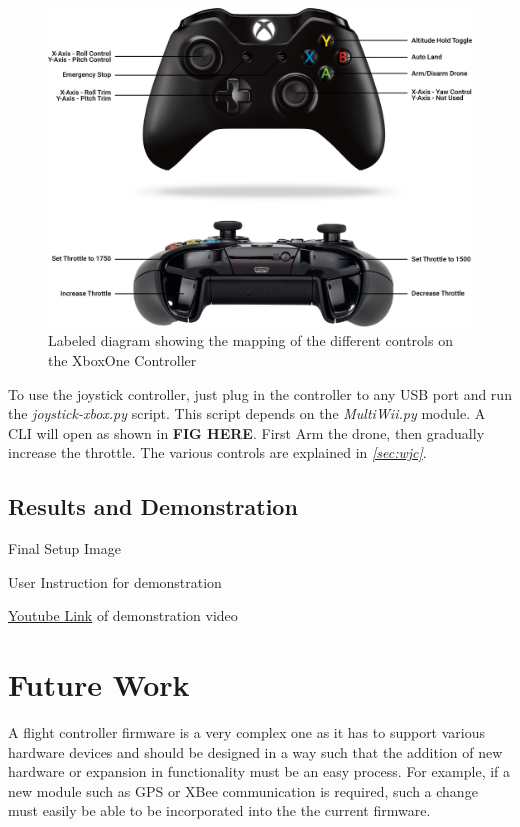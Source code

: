 \documentclass[a4paper,12pt,oneside]{book}
\begin{document}
\begin{figure}[!htb]
\centering
\includegraphics[width=\textwidth]{images/joystick_controls}
\caption{Labeled diagram showing the mapping of the different controls on the Xbox\textregistered One Controller\cite{xbox}}
\label{fig:joycon}
\end{figure}

To use the joystick controller, just plug in the controller to any USB port and run the \textit{joystick-xbox.py} script. This script depends on the \textit{MultiWii.py} module. A CLI will open as shown in \textbf{FIG HERE}. First Arm the drone, then gradually increase the throttle. The various controls are explained in \textit{\autoref{sec:wjc}}.\\

\section{Results and Demonstration}

Final Setup Image

User Instruction for demonstration

\href{http://www.youtube.com}{Youtube Link} of demonstration video 

\chapter[Future Work]{Future Work}
A flight controller firmware is a very complex one as it has to support various hardware devices and should be designed in a way such that the addition of new hardware or expansion in functionality must be an easy process. For example, if a new module such as GPS or XBee communication is required, such a change must easily be able to be incorporated into the the current firmware.\\
\end{document}
